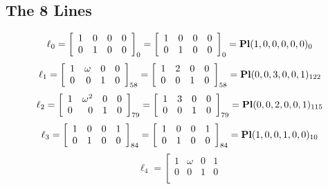 \documentclass{article}
\begin{document}
{\subsection*{The 8 Lines}
$$
\ell_{0} = 
\left[
\begin{array}{*{4}{r}}
1 & 0 & 0 & 0\\
0 & 1 & 0 & 0\\
\end{array}
\right]
_{0}
=
\left[
\begin{array}{*{4}c}
1  & 0  & 0  & 0\\
0  & 1  & 0  & 0\\
\end{array}
\right]_{0}
={\rm\bf Pl}(1,0,0,0,0,0 )_{0}$$
$$
\ell_{1} = 
\left[
\begin{array}{*{4}{r}}
1 & \omega  & 0 & 0\\
0 & 0 & 1 & 0\\
\end{array}
\right]
_{58}
=
\left[
\begin{array}{*{4}c}
1  & 2  & 0  & 0\\
0  & 0  & 1  & 0\\
\end{array}
\right]_{58}
={\rm\bf Pl}(0,0,3,0,0,1 )_{122}$$
$$
\ell_{2} = 
\left[
\begin{array}{*{4}{r}}
1 & \omega^{2} & 0 & 0\\
0 & 0 & 1 & 0\\
\end{array}
\right]
_{79}
=
\left[
\begin{array}{*{4}c}
1  & 3  & 0  & 0\\
0  & 0  & 1  & 0\\
\end{array}
\right]_{79}
={\rm\bf Pl}(0,0,2,0,0,1 )_{115}$$
$$
\ell_{3} = 
\left[
\begin{array}{*{4}{r}}
1 & 0 & 0 & 1\\
0 & 1 & 0 & 0\\
\end{array}
\right]
_{84}
=
\left[
\begin{array}{*{4}c}
1  & 0  & 0  & 1\\
0  & 1  & 0  & 0\\
\end{array}
\right]_{84}
={\rm\bf Pl}(1,0,0,1,0,0 )_{10}$$
$$
\ell_{4} = 
\left[
\begin{array}{*{4}{r}}
1 & \omega  & 0 & 1\\
0 & 0 & 1 & 0\\

\end{array}$$}
\end{document}
